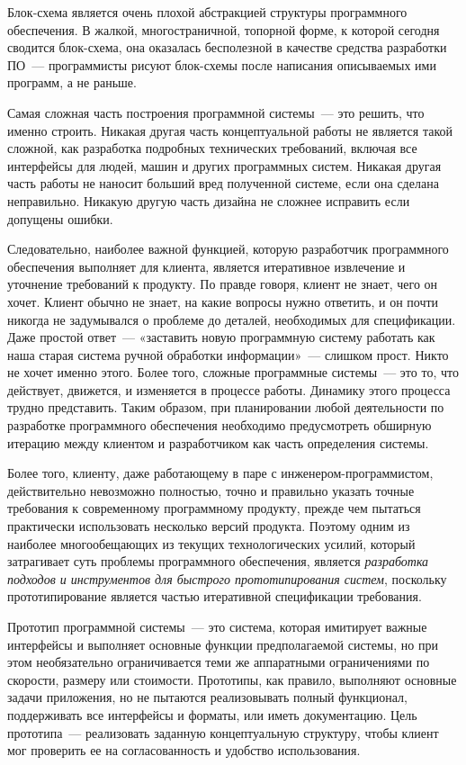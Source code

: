 Блок-схема является очень плохой абстракцией структуры программного обеспечения.
В жалкой, многостраничной, топорной форме, к которой сегодня сводится
блок-схема, она оказалась бесполезной в качестве средства разработки ПО\ ---
программисты рисуют блок-схемы после написания описываемых ими программ, а не
раньше.

Самая сложная часть построения программной системы\ --- это решить, что именно
строить. Никакая другая часть концептуальной работы не является такой сложной,
как разработка подробных технических требований, включая все интерфейсы для
людей, машин и других программных систем. Никакая другая часть работы не наносит
больший вред полученной системе, если она сделана неправильно. Никакую другую
часть дизайна не сложнее исправить если допущены ошибки.

Следовательно, наиболее важной функцией, которую разработчик программного
обеспечения выполняет для клиента, является итеративное извлечение и уточнение
требований к продукту. По правде говоря, клиент не знает, чего он хочет. Клиент
обычно не знает, на какие вопросы нужно ответить, и он почти никогда не
задумывался о проблеме до деталей, необходимых для спецификации. Даже простой
ответ\ --- «заставить новую программную систему работать как наша старая система
ручной обработки информации»\ --- слишком прост. Никто не хочет именно этого.
Более того, сложные программные системы\ --- это то, что действует, движется, и
изменяется в процессе работы. Динамику этого процесса трудно представить. Таким
образом, при планировании любой деятельности по разработке программного
обеспечения необходимо предусмотреть обширную итерацию между клиентом и
разработчиком как часть определения системы.

Более того, клиенту, даже работающему в паре с инженером-програм\-мистом,
действительно невозможно полностью, точно и правильно указать точные требования
к современному программному продукту, прежде чем пытаться практически
использовать несколько версий продукта. Поэтому одним из наиболее многообещающих
из текущих технологических усилий, который затрагивает суть проблемы
программного обеспечения, является \emph{разработка подходов и инструментов для
быстрого прототипирования систем}, поскольку прототипирование является частью
итеративной спецификации требования.

Прототип программной системы\ --- это система, которая имитирует важные
интерфейсы и выполняет основные функции предполагаемой системы, но при этом
необязательно ограничивается теми же аппаратными ограничениями по скорости,
размеру или стоимости. Прототипы, как правило, выполняют основные задачи
приложения, но не пытаются реализовывать полный функционал, поддерживать все
интерфейсы и форматы, или иметь документацию. Цель прототипа\ --- реализовать
заданную концептуальную структуру, чтобы клиент мог проверить ее на
согласованность и удобство использования.


